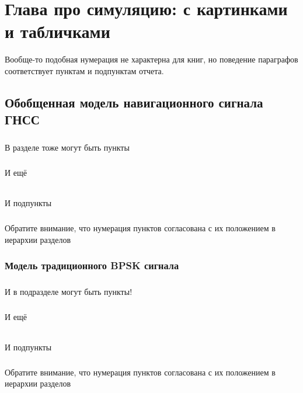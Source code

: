 \chapter{Глава про симуляцию: с картинками и табличками}
\label{cha:simulation}
\thispagestyle{chapterpage}

Вообще-то подобная нумерация не характерна для книг, но поведение параграфов соответствует пунктам и подпунктам отчета.

\section{Обобщенная модель навигационного сигнала ГНСС}

\paragraph{}В разделе тоже могут быть пункты

\paragraph{}И ещё

\subparagraph{}И подпункты

\paragraph{}Обратите внимание, что нумерация пунктов согласована с их положением в иерархии разделов


\subsection{Модель традиционного BPSK сигнала}

\paragraph{}И в подразделе могут быть пункты!

\paragraph{}И ещё

\subparagraph{}И подпункты

\paragraph{}Обратите внимание, что нумерация пунктов согласована с их положением в иерархии разделов

